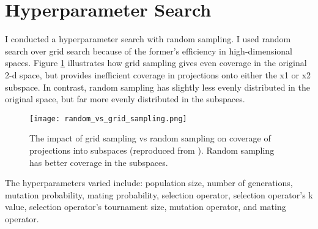 \section{Hyperparameter Search}
I conducted a hyperparameter search with random sampling. 
I used random search over grid search because of the former's efficiency in 
high-dimensional spaces. 
Figure \ref{fig:random_vs_grid_sampling} illustrates how grid sampling gives 
even coverage in the original 2-d space, but provides inefficient coverage in 
projections onto either the x1 or x2 subspace.  
In contrast, random sampling has slightly less evenly distributed in the original 
space, but far more evenly distributed in the subspaces.
\begin{figure}[]
    \centering
    \texttt{[image: random\_vs\_grid\_sampling.png]} 
    \caption{The impact of grid sampling vs random sampling on coverage of projections 
    into subspaces (reproduced from \cite{}). Random sampling has better coverage 
    in the subspaces.}
    \label{fig:random_vs_grid_sampling}
\end{figure}
The hyperparameters varied include: population size, number of generations, 
mutation probability, mating probability, selection operator, selection operator's 
k value, selection operator's tournament size, mutation operator, and mating 
operator.  

